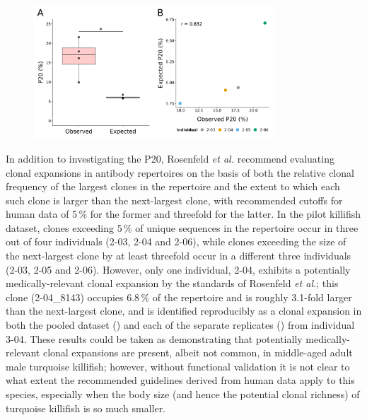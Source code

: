 \begin{figure}
\centering
\includegraphics[width=0.8\textwidth]{_Figures/png/pilot-clones-zipf-p20-obs-exp}
\label{fig:igseq-pilot-clones-zipf-p20}
\end{figure}

In addition to investigating the P20, Rosenfeld \textit{et al.} \parencite{rosenfeld2018clonesize} recommend evaluating clonal expansions in antibody repertoires on the basis of both the relative clonal frequency of the largest clones in the repertoire and the extent to which each such clone is larger than the next-largest clone, with recommended cutoffs for human data of 5\,\% for the former and threefold for the latter. In the pilot killifish dataset, clones exceeding 5\,\% of unique sequences in the repertoire occur in three out of four individuals (2-03, 2-04 and 2-06), while clones exceeding the size of the next-largest clone by at least threefold occur in a different three individuals (2-03, 2-05 and 2-06). However, only one individual, 2-04, exhibits a potentially medically-relevant clonal expansion by the standards of Rosenfeld \textit{et al.}; this clone (2-04\_8143) occupies 6.8\,\% of the repertoire and is roughly 3.1-fold larger than the next-largest clone, and is identified reproducibly as a clonal expansion in both the pooled dataset () and each of the separate replicates () from individual 3-04. These results could be taken as demonstrating that potentially medically-relevant clonal expansions are present, albeit not common, in middle-aged adult male turquoise killifish; however, without functional validation it is not clear to what extent the recommended guidelines derived from human data apply to this species, especially when the body size (and hence the potential clonal richness) of turquoise killifish is so much smaller.


